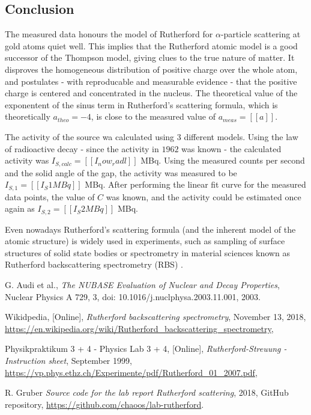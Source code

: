 \documentclass[a4paper]{article}
\begin{document}
\subsection{Conclusion}

The measured data honours the model of Rutherford for $\alpha$-particle scattering at gold atoms quiet well. This implies that the Rutherford atomic model is a good successor of the Thompson model, giving clues to the true nature of matter. It disproves the homogeneous distribution of positive charge over the whole atom, and postulates - with reproducable and measurable evidence - that the positive charge is centered and concentrated in the nucleus. The theoretical value of the exponentent of the sinus term in Rutherford's scattering formula, which is theoretically $a_{theo} = -4$, is close to the measured value of $a_{meas} = [[a]]$.

The activity of the source wa calculated using 3 different models. Using the law of radioactive decay - since the activity in $1962$ was known - the calculated activity was $I_{S,calc} = [[I_now_radl]]$ MBq. Using the measured counts per second and the solid angle of the gap, the activity was measured to be $I_{S,1} = [[I_S1MBq]]$ MBq. After performing the linear fit curve for the measured data points, the value of $C$ was known, and the activity could be estimated once again as $I_{S,2} = [[I_S2MBq]]$ MBq.

Even nowadays Rutherford's scattering formula (and the inherent model of the atomic structure) is widely used in experiments, such as sampling of surface structures of solid state bodies or spectrometry in material sciences known as Rutherford backscattering spectrometry (RBS) \cite{wiki2018}.

\begin{thebibliography}{9}

  G. Audi et al.,
  \textit{The NUBASE Evaluation of Nuclear and Decay Properties},
  Nuclear Physics A 729,
  3,
  doi: 10.1016/j.nuclphysa.2003.11.001,
  2003.

  Wikidpedia, [Online],
  \textit{Rutherford backscattering spectrometry},
  November 13, 2018,
  \url{https://en.wikipedia.org/wiki/Rutherford_backscattering_spectrometry},


  Physikpraktikum 3 + 4 - Physics Lab 3 + 4, [Online],
  \textit{Rutherford-Streuung - Instruction sheet},
  September 1999,
  \url{https://vp.phys.ethz.ch/Experimente/pdf/Rutherford_01_2007.pdf},

  R. Gruber
  \textit{Source code for the lab report Rutherford scattering},
  2018,
  GitHub repository,
  \url{https://github.com/chaoos/lab-rutherford}.

\end{thebibliography}
\end{document}
